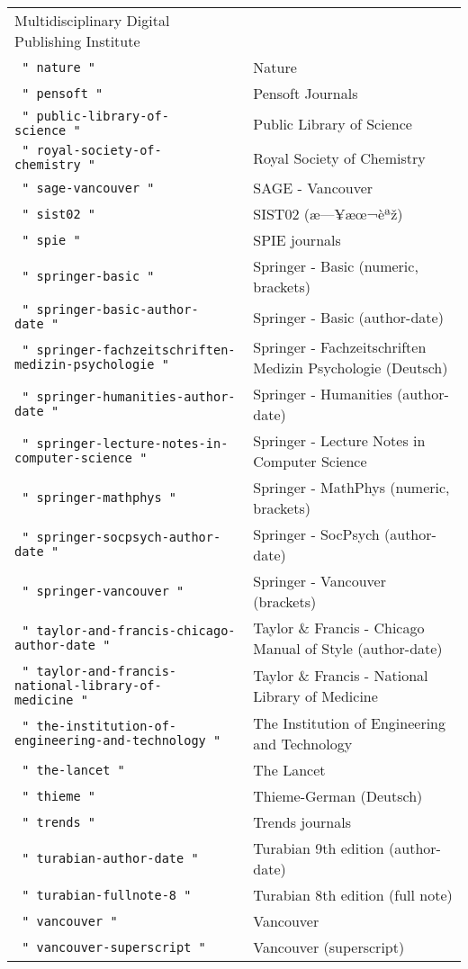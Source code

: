 \begin{longtable}[]{@{}ll@{}}
Multidisciplinary Digital Publishing Institute \\
\texttt{\ "\ nature\ "\ } & Nature \\
\texttt{\ "\ pensoft\ "\ } & Pensoft Journals \\
\texttt{\ "\ public-library-of-science\ "\ } & Public Library of
Science \\
\texttt{\ "\ royal-society-of-chemistry\ "\ } & Royal Society of
Chemistry \\
\texttt{\ "\ sage-vancouver\ "\ } & SAGE - Vancouver \\
\texttt{\ "\ sist02\ "\ } & SIST02 (æ---¥æœ¬èªž) \\
\texttt{\ "\ spie\ "\ } & SPIE journals \\
\texttt{\ "\ springer-basic\ "\ } & Springer - Basic (numeric,
brackets) \\
\texttt{\ "\ springer-basic-author-date\ "\ } & Springer - Basic
(author-date) \\
\texttt{\ "\ springer-fachzeitschriften-medizin-psychologie\ "\ } &
Springer - Fachzeitschriften Medizin Psychologie (Deutsch) \\
\texttt{\ "\ springer-humanities-author-date\ "\ } & Springer -
Humanities (author-date) \\
\texttt{\ "\ springer-lecture-notes-in-computer-science\ "\ } & Springer
- Lecture Notes in Computer Science \\
\texttt{\ "\ springer-mathphys\ "\ } & Springer - MathPhys (numeric,
brackets) \\
\texttt{\ "\ springer-socpsych-author-date\ "\ } & Springer - SocPsych
(author-date) \\
\texttt{\ "\ springer-vancouver\ "\ } & Springer - Vancouver
(brackets) \\
\texttt{\ "\ taylor-and-francis-chicago-author-date\ "\ } & Taylor \&
Francis - Chicago Manual of Style (author-date) \\
\texttt{\ "\ taylor-and-francis-national-library-of-medicine\ "\ } &
Taylor \& Francis - National Library of Medicine \\
\texttt{\ "\ the-institution-of-engineering-and-technology\ "\ } & The
Institution of Engineering and Technology \\
\texttt{\ "\ the-lancet\ "\ } & The Lancet \\
\texttt{\ "\ thieme\ "\ } & Thieme-German (Deutsch) \\
\texttt{\ "\ trends\ "\ } & Trends journals \\
\texttt{\ "\ turabian-author-date\ "\ } & Turabian 9th edition
(author-date) \\
\texttt{\ "\ turabian-fullnote-8\ "\ } & Turabian 8th edition (full
note) \\
\texttt{\ "\ vancouver\ "\ } & Vancouver \\
\texttt{\ "\ vancouver-superscript\ "\ } & Vancouver (superscript) \\
\end{longtable}

